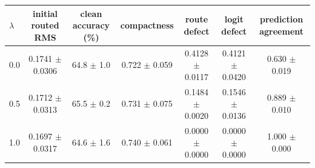 \begin{tabular}{@{}lcccccc@{}}
\toprule
$\lambda$ & initial routed RMS & clean accuracy (\%) & compactness & route defect & logit defect & prediction agreement \\
\midrule
0.0 & 0.1741 $\pm$ 0.0306 & 64.8 $\pm$ 1.0 & 0.722 $\pm$ 0.059 & 0.4128 $\pm$ 0.0117 & 0.4121 $\pm$ 0.0420 & 0.630 $\pm$ 0.019 \\
0.5 & 0.1712 $\pm$ 0.0313 & 65.5 $\pm$ 0.2 & 0.731 $\pm$ 0.075 & 0.1484 $\pm$ 0.0020 & 0.1546 $\pm$ 0.0136 & 0.889 $\pm$ 0.010 \\
1.0 & 0.1697 $\pm$ 0.0317 & 64.6 $\pm$ 1.6 & 0.740 $\pm$ 0.061 & 0.0000 $\pm$ 0.0000 & 0.0000 $\pm$ 0.0000 & 1.000 $\pm$ 0.000 \\
\bottomrule
\end{tabular}

